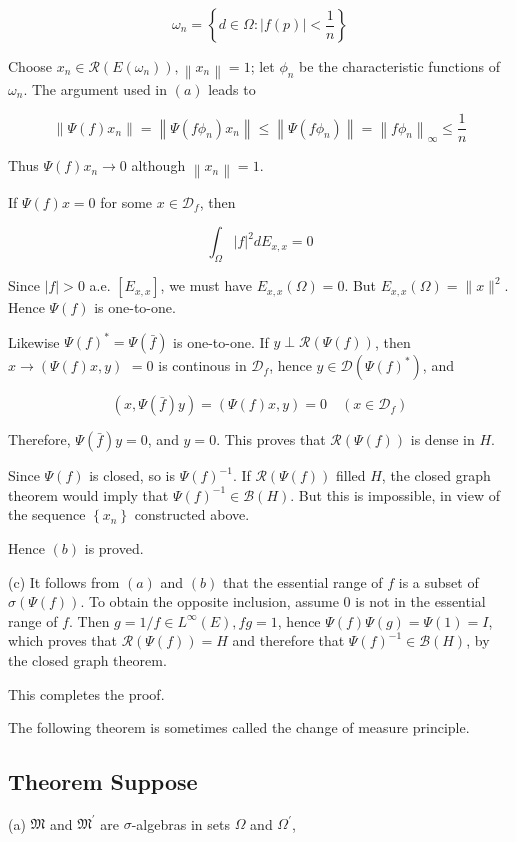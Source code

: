 \documentclass[10pt]{article}
\begin{document}
$$
\omega_{n}=\left\{d \in \Omega:|f(p)|<\frac{1}{n}\right\}
$$

Choose $x_{n} \in \mathscr{R}\left(E\left(\omega_{n}\right)\right),\left\|x_{n}\right\|=1$; let $\phi_{n}$ be the characteristic functions of $\omega_{n}$. The argument used in $(a)$ leads to

$$
\left\|\Psi(f) x_{n}\right\|=\left\|\Psi\left(f \phi_{n}\right) x_{n}\right\| \leq\left\|\Psi\left(f \phi_{n}\right)\right\|=\left\|f \phi_{n}\right\|_{\infty} \leq \frac{1}{n}
$$

Thus $\Psi(f) x_{n} \rightarrow 0$ although $\left\|x_{n}\right\|=1$.

If $\Psi(f) x=0$ for some $x \in \mathscr{D}_{f}$, then

$$
\int_{\Omega}|f|^{2} d E_{x, x}=0
$$

Since $|f|>0$ a.e. $\left[E_{x, x}\right]$, we must have $E_{x, x}(\Omega)=0$. But $E_{x, x}(\Omega)=\|x\|^{2}$. Hence $\Psi(f)$ is one-to-one.

Likewise $\Psi(f)^{*}=\Psi(\bar{f})$ is one-to-one. If $y \perp \mathscr{R}(\Psi(f))$, then $x \rightarrow(\Psi(f) x, y)$ $=0$ is continous in $\mathscr{D}_{f}$, hence $y \in \mathscr{D}\left(\Psi(f)^{*}\right)$, and

$$
(x, \Psi(\bar{f}) y)=(\Psi(f) x, y)=0 \quad\left(x \in \mathscr{D}_{f}\right)
$$

Therefore, $\Psi(\bar{f}) y=0$, and $y=0$. This proves that $\mathscr{R}(\Psi(f))$ is dense in $H$.

Since $\Psi(f)$ is closed, so is $\Psi(f)^{-1}$. If $\mathscr{R}(\Psi(f))$ filled $H$, the closed graph theorem would imply that $\Psi(f)^{-1} \in \mathscr{B}(H)$. But this is impossible, in view of the sequence $\left\{x_{n}\right\}$ constructed above.

Hence $(b)$ is proved.

(c) It follows from $(a)$ and $(b)$ that the essential range of $f$ is a subset of $\sigma(\Psi(f))$. To obtain the opposite inclusion, assume 0 is not in the essential range of $f$. Then $g=1 / f \in L^{\infty}(E), f g=1$, hence $\Psi(f) \Psi(g)=\Psi(1)=I$, which proves that $\mathscr{R}(\Psi(f))=H$ and therefore that $\Psi(f)^{-1} \in \mathscr{B}(H)$, by the closed graph theorem.

This completes the proof.

The following theorem is sometimes called the change of measure principle.

\subsection{Theorem Suppose}
(a) $\mathfrak{M}$ and $\mathfrak{M}^{\prime}$ are $\sigma$-algebras in sets $\Omega$ and $\Omega^{\prime}$,
\end{document}
